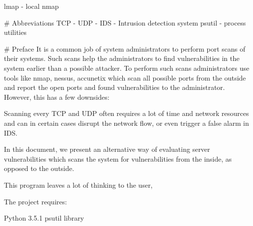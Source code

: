 lmap - local nmap

# Abbreviations
TCP -
UDP -
IDS - Intrusion detection system
psutil - process utilities

# Preface
It is a common job of system administrators to perform port scans of their systems.
Such scans help the administrators to find vulnerabilities in the system earlier than a possible attacker.
To perform such scans administrators use tools like nmap, nessus, accunetix which scan all possible ports from the
outside and report the open ports and found vulnerabilities to the administrator. However, this has a few downsides:

Scanning every TCP and UDP often requires a lot of time and network resources and can in certain cases disrupt the
network flow, or even trigger a false alarm in IDS.

In this document, we present an alternative way of evaluating server vulnerabilities which scans the system for
vulnerabilities from the inside, as opposed to the outside.

This program leaves a lot of thinking to the user,


The project requires:

Python 3.5.1
psutil library